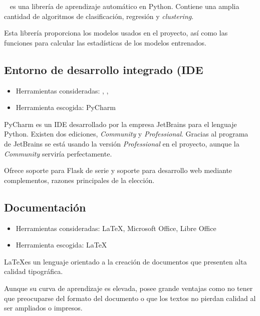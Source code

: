 ~\cite{art:scikit-learn} es una librería de aprendizaje automático en Python. Contiene una amplia cantidad de algoritmos de clasificación, regresión y \textit{clustering}.

Esta librería proporciona los modelos usados en el proyecto, así como las funciones para calcular las estadísticas de los modelos entrenados.

\subsection{Entorno de desarrollo integrado (IDE}

\begin{itemize}
	\tightlist
	\item Herramientas consideradas: , , 
	\item Herramienta escogida: PyCharm
\end{itemize}

PyCharm es un IDE desarrollado por la empresa JetBrains para el lenguaje Python. Existen dos ediciones, \textit{Community} y \textit{Professional}. Gracias al programa  de JetBrains se está usando la versión \textit{Professional} en el proyecto, aunque la \textit{Community} serviría perfectamente.

Ofrece soporte para Flask de serie y soporte para desarrollo web mediante complementos, razones principales de la elección.

\subsection{Documentación}

\begin{itemize}
	\tightlist
	\item Herramientas consideradas: \LaTeX, Microsoft Office, Libre Office
	\item Herramienta escogida: \LaTeX
\end{itemize}

\LaTeX es un lenguaje orientado a la creación de documentos que presenten alta calidad tipográfica.

Aunque su curva de aprendizaje es elevada, posee grande ventajas como no tener que preocuparse del formato del documento o que los textos no pierdan calidad al ser ampliados o impresos.

